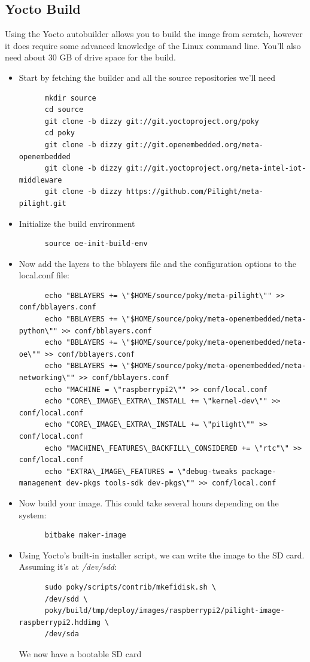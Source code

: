 \subsection{Yocto Build}
Using the Yocto autobuilder allows you to build the image from scratch, however it does require some advanced knowledge of the Linux command line. You'll also need about 30 GB of drive space for the build.
\begin{itemize}
   \item Start by fetching the builder and all the source repositories we'll need
      \begin{lstlisting}
      mkdir source
      cd source
      git clone -b dizzy git://git.yoctoproject.org/poky
      cd poky
      git clone -b dizzy git://git.openembedded.org/meta-openembedded
      git clone -b dizzy git://git.yoctoproject.org/meta-intel-iot-middleware
      git clone -b dizzy https://github.com/Pilight/meta-pilight.git
      \end{lstlisting}
   \item Initialize the build environment
      \begin{lstlisting}
      source oe-init-build-env
      \end{lstlisting}
   \item Now add the layers to the bblayers file and the configuration options to the local.conf file:
      \begin{lstlisting}
      echo "BBLAYERS += \"$HOME/source/poky/meta-pilight\"" >> conf/bblayers.conf
      echo "BBLAYERS += \"$HOME/source/poky/meta-openembedded/meta-python\"" >> conf/bblayers.conf
      echo "BBLAYERS += \"$HOME/source/poky/meta-openembedded/meta-oe\"" >> conf/bblayers.conf
      echo "BBLAYERS += \"$HOME/source/poky/meta-openembedded/meta-networking\"" >> conf/bblayers.conf
      echo "MACHINE = \"raspberrypi2\"" >> conf/local.conf
      echo "CORE\_IMAGE\_EXTRA\_INSTALL += \"kernel-dev\"" >> conf/local.conf
      echo "CORE\_IMAGE\_EXTRA\_INSTALL += \"pilight\"" >> conf/local.conf
      echo "MACHINE\_FEATURES\_BACKFILL\_CONSIDERED += \"rtc"\" >> conf/local.conf
      echo "EXTRA\_IMAGE\_FEATURES = \"debug-tweaks package-management dev-pkgs tools-sdk dev-pkgs\"" >> conf/local.conf
      \end{lstlisting}
   \item Now build your image. This could take several hours depending on the system:
      \begin{lstlisting}
      bitbake maker-image
      \end{lstlisting}
   \item Using Yocto's built-in installer script, we can write the image to the SD card. Assuming it's at \textit{/dev/sdd}:
      \begin{lstlisting}
      sudo poky/scripts/contrib/mkefidisk.sh \
      /dev/sdd \
      poky/build/tmp/deploy/images/raspberrypi2/pilight-image-raspberrypi2.hddimg \
      /dev/sda
      \end{lstlisting}
      We now have a bootable SD card
\end{itemize}

